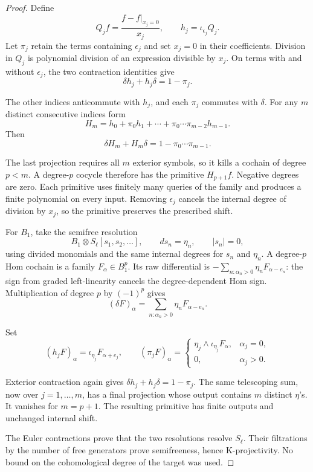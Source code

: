 \begin{proof}
Define
\[
 Q_jf=\frac{f-f|_{x_j=0}}{x_j},\qquad
 h_j=\iota_{\epsilon_j}Q_j.
\]
Let $\pi_j$ retain the terms containing $\epsilon_j$ and
set $x_j=0$ in their coefficients. Division in $Q_j$ is
polynomial division of an expression divisible by $x_j$.
On terms with and without $\epsilon_j$, the two contraction
identities give
\[
 \delta h_j+h_j\delta=1-\pi_j.
\]

The other indices anticommute with $h_j$, and each $\pi_j$
commutes with $\delta$. For any $m$ distinct consecutive
indices form
\[
 H_m=h_0+\pi_0h_1+\cdots+\pi_0\cdots\pi_{m-2}h_{m-1}.
\]
Then
\[
 \delta H_m+H_m\delta=1-\pi_0\cdots\pi_{m-1}.
\]

The last projection requires all $m$ exterior symbols, so
it kills a cochain of degree $p<m$. A degree-$p$ cocycle
therefore has the primitive $H_{p+1}f$. Negative degrees
are zero. Each primitive uses finitely many queries of the
family and produces a finite polynomial on every input.
Removing $\epsilon_j$ cancels the internal degree of division
by $x_j$, so the primitive preserves the prescribed shift.

For $B_1$, take the semifree resolution
\[
 B_1\otimes S_\ell[s_1,s_2,\ldots],
 \qquad ds_n=\eta_n,\qquad |s_n|=0,
\]
using divided monomials and the same internal degrees for
$s_n$ and $\eta_n$. A degree-$p$ Hom cochain is a family
$F_\alpha\in B_1^p$. Its raw differential is
$-\sum_{n:\alpha_n>0}\eta_nF_{\alpha-e_n}$: the sign from
graded left-linearity cancels the degree-dependent Hom
sign. Multiplication of degree $p$ by $(-1)^p$ gives
\[
 (\delta F)_\alpha=\sum_{n:\alpha_n>0}
                         \eta_nF_{\alpha-e_n}.
\]

Set
\[
 (h_jF)_\alpha=\iota_{\eta_j}F_{\alpha+e_j},\qquad
 (\pi_jF)_\alpha=
 \begin{cases}
 \eta_j\wedge\iota_{\eta_j}F_\alpha,&\alpha_j=0,\\
 0,&\alpha_j>0.
 \end{cases}
\]

Exterior contraction again gives
$\delta h_j+h_j\delta=1-\pi_j$.
The same telescoping sum, now over $j=1,\ldots,m$, has a
final projection whose output contains $m$ distinct
$\eta$'s. It vanishes for $m=p+1$. The resulting primitive
has finite outputs and unchanged internal shift.

The
Euler contractions prove that the two resolutions resolve
$S_\ell$. Their filtrations by the number of free generators
prove semifreeness, hence K-projectivity. No bound on the
cohomological degree of the target was used.


\end{proof}
